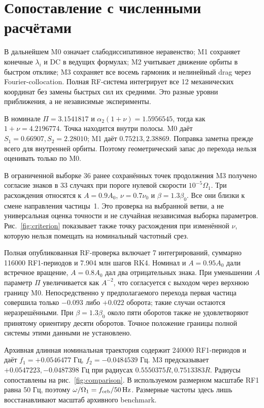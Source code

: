 \documentclass[aip,cha,reprint,a4paper,amsmath,amssymb]{revtex4-2}
\begin{document}
\section{Сопоставление с численными расчётами}
В дальнейшем M0 означает слабодиссипативное неравенство; M1 сохраняет конечные $\lambda_i$ и DC в ведущих формулах; M2 учитывает движение орбиты в быстром отклике; M3 сохраняет все восемь гармоник и нелинейный drag через Fourier-collocation. Полная RF-система интегрирует все 12 механических координат без замены быстрых сил их средними. Это разные уровни приближения, а не независимые эксперименты.

В номинале $\Pi=3.1541817$ и $\alpha_2(1+\nu)=1.5956545$, тогда как $1+\nu=4.2196774$. Точка находится внутри полосы. M0 даёт $S_1=0.66907,S_2=2.28010$; M1 даёт $0.75213,2.38869$. Поправка заметна прежде всего для внутренней орбиты. Поэтому геометрический запас до перехода нельзя оценивать только по M0.

В ограниченной выборке 36 ранее сохранённых точек продолжения M3 получено согласие знаков в 33 случаях при пороге нулевой скорости $10^{-5}\Omega_1$. Три расхождения относятся к $A=0.9A_0$, $\nu=0.7\nu_0$ и $\beta=1.3\beta_0$. Все они близки к смене направления частицы~1. Это проверка на выбранной ветви, а не универсальная оценка точности и не случайная независимая выборка параметров. Рис.~\ref{fig:criterion} показывает также точку расхождения при изменённой $\nu$, которую нельзя помещать на номинальный частотный срез.

Полная опубликованная RF-проверка включает 7 интегрирований, суммарно 116000 RF1-периодов и 7.904 млн шагов RK4. Номинал и $A=0.95A_0$ дали встречное вращение, $A=0.8A_0$ дал два отрицательных знака. При уменьшении $A$ параметр $\Pi$ увеличивается как $A^{-2}$, что согласуется с выходом через верхнюю границу M0. Непосредственно у предполагаемого перехода первая частица совершила только $-0.093$ либо $+0.022$ оборота; такие случаи остаются неразрешёнными. При $\beta=1.3\beta_0$ около пяти оборотов также не удовлетворяют принятому ориентиру десяти оборотов. Точное положение границы полной системы этими данными не установлено.

Архивная длинная номинальная траектория содержит 240000 RF1-периодов и даёт $f_1=+0.0546477$ Гц, $f_2=-0.0484539$ Гц. M3 предсказывает $+0.0547223,-0.0487398$ Гц при радиусах $0.5550375R,0.7513383R$. Радиусы сопоставлены на рис.~\ref{fig:comparison}. В используемом размерном масштабе RF1 равна 50 Гц, поэтому $\omega/\Omega_1=f_{\rm orb}/50\,\mathrm{Hz}$. Размерные частоты здесь лишь восстанавливают масштаб архивного benchmark.
\end{document}

